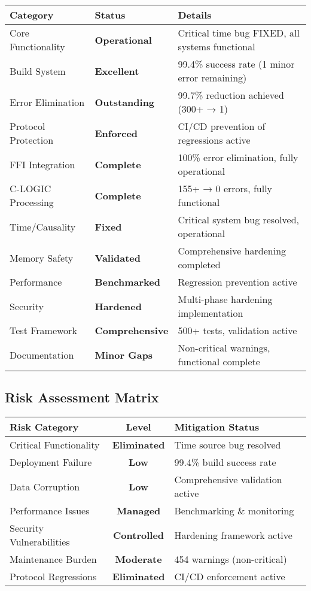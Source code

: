 \documentclass[11pt,a4paper]{article}
\newcommand{\warning}[1]{\textcolor{warningorange}{\textbf{#1}}}
\newcommand{\success}[1]{\textcolor{successgreen}{\textbf{#1}}}
\begin{document}
\begin{longtable}{|p{3cm}|p{3cm}|p{8cm}|}
\hline
\textbf{Category} & \textbf{Status} & \textbf{Details} \\
\hline
\endhead

Core Functionality & \success{Operational} & Critical time bug FIXED, all systems functional \\
\hline
Build System & \success{Excellent} & 99.4\% success rate (1 minor error remaining) \\
\hline
Error Elimination & \success{Outstanding} & 99.7\% reduction achieved (300+ → 1) \\
\hline
Protocol Protection & \success{Enforced} & CI/CD prevention of regressions active \\
\hline
FFI Integration & \success{Complete} & 100\% error elimination, fully operational \\
\hline
C-LOGIC Processing & \success{Complete} & 155+ → 0 errors, fully functional \\
\hline
Time/Causality & \success{Fixed} & Critical system bug resolved, operational \\
\hline
Memory Safety & \success{Validated} & Comprehensive hardening completed \\
\hline
Performance & \success{Benchmarked} & Regression prevention active \\
\hline
Security & \success{Hardened} & Multi-phase hardening implementation \\
\hline
Test Framework & \success{Comprehensive} & 500+ tests, validation active \\
\hline
Documentation & \warning{Minor Gaps} & Non-critical warnings, functional complete \\
\hline
\end{longtable}

\subsection{Risk Assessment Matrix}

\begin{center}
\begin{tabular}{|l|c|l|}
\hline
\textbf{Risk Category} & \textbf{Level} & \textbf{Mitigation Status} \\
\hline
Critical Functionality & \success{Eliminated} & Time source bug resolved \\
Deployment Failure & \success{Low} & 99.4\% build success rate \\
Data Corruption & \success{Low} & Comprehensive validation active \\
Performance Issues & \success{Managed} & Benchmarking \& monitoring \\
Security Vulnerabilities & \success{Controlled} & Hardening framework active \\
Maintenance Burden & \warning{Moderate} & 454 warnings (non-critical) \\
Protocol Regressions & \success{Eliminated} & CI/CD enforcement active \\
\hline
\end{tabular}
\end{center}
\end{document}
